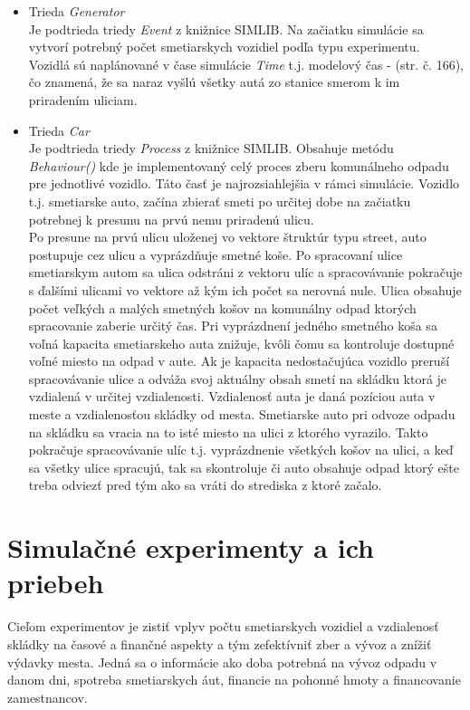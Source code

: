 \documentclass[11pt,a4paper]{article}
\begin{document}
    \begin{itemize}
        \item Trieda \textit{Generator}\\[0.1em]
              Je podtrieda triedy \textit{Event} z knižnice SIMLIB. Na začiatku simulácie sa vytvorí potrebný počet smetiarskych vozidiel podľa typu experimentu. Vozidlá sú naplánované v čase simulácie \textit{Time} t.j. modelový čas - \cite{IMS}(str. č. 166), čo znamená, že sa naraz vyšlú všetky autá zo stanice smerom k im priradením uliciam. {\color{red}{DOBA stredisko-1. ulica!}}
        \item Trieda \textit{Car}\\[0.1em]
              Je podtrieda triedy \textit{Process} z knižnice SIMLIB. Obsahuje metódu \textit{Behaviour()} kde je implementovaný celý proces zberu komunálneho odpadu pre jednotlivé vozidlo. Táto časť je najrozsiahlejšia v rámci simulácie. Vozidlo t.j. smetiarske auto, začína zbierať smeti po určitej dobe na začiatku potrebnej k presunu na prvú nemu priradenú ulicu.\\[0.3em]
              Po presune na prvú ulicu uloženej vo vektore štruktúr typu street, auto postupuje cez ulicu a vyprázdňuje smetné koše. Po spracovaní ulice smetiarskym autom sa ulica odstráni z vektoru ulíc a spracovávanie pokračuje s ďalšími ulicami vo vektore až kým ich počet sa nerovná nule. Ulica obsahuje počet veľkých a malých smetných košov na komunálny odpad ktorých spracovanie zaberie určitý čas. Pri vyprázdnení jedného smetného koša sa voľná kapacita smetiarskeho auta znižuje, kvôli čomu sa kontroluje dostupné voľné miesto na odpad v aute. Ak je kapacita nedostačujúca vozidlo preruší spracovávanie ulice a odváža svoj aktuálny obsah smetí na skládku ktorá je vzdialená v určitej vzdialenosti. Vzdialenosť auta je daná pozíciou auta v meste a vzdialenosťou skládky od mesta. Smetiarske auto pri odvoze odpadu na skládku sa vracia na to isté miesto na ulici z ktorého vyrazilo. Takto pokračuje spracovávanie ulíc t.j. vyprázdnenie všetkých košov na ulici, a keď sa všetky ulice spracujú, tak sa skontroluje či auto obsahuje odpad ktorý ešte treba odviezť pred tým ako sa vráti do strediska z ktoré začalo.
    \end{itemize}

\section{Simulačné experimenty a ich priebeh}

    \indent Cieľom experimentov je zistiť vplyv počtu smetiarskych vozidiel a vzdialenosť skládky na časové a finančné aspekty a tým zefektívniť zber a vývoz a znížiť výdavky mesta. Jedná sa o informácie ako doba potrebná na vývoz odpadu v danom dni, spotreba smetiarskych áut, financie na pohonné hmoty a financovanie zamestnancov.
\end{document}
